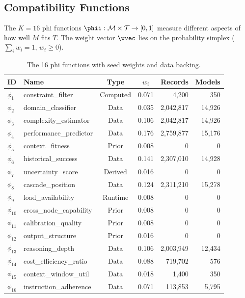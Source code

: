 \subsection{Compatibility Functions}

The $K=16$ phi functions $\phii: \mathcal{M} \times \mathcal{T} \to [0,1]$ measure different aspects of how well $M$ fits $T$. The weight vector $\wvec$ lies on the probability simplex ($\sum_i w_i = 1$, $w_i \geq 0$).

\begin{table}[h]
\centering
\caption{The 16 phi functions with seed weights and data backing.}
\label{tab:phi_functions}
\small
\begin{tabular}{llccrr}
\toprule
\textbf{ID} & \textbf{Name} & \textbf{Type} & \textbf{$w_i$} & \textbf{Records} & \textbf{Models} \\
\midrule
$\phi_1$ & constraint\_filter & Computed & 0.071 & 4{,}200 & 350 \\
$\phi_2$ & domain\_classifier & Data & 0.035 & 2{,}042{,}817 & 14{,}926 \\
$\phi_3$ & complexity\_estimator & Data & 0.106 & 2{,}042{,}817 & 14{,}926 \\
$\phi_4$ & performance\_predictor & Data & 0.176 & 2{,}759{,}877 & 15{,}176 \\
$\phi_5$ & context\_fitness & Prior & 0.008 & 0 & 0 \\
$\phi_6$ & historical\_success & Data & 0.141 & 2{,}307{,}010 & 14{,}928 \\
$\phi_7$ & uncertainty\_score & Derived & 0.016 & 0 & 0 \\
$\phi_8$ & cascade\_position & Data & 0.124 & 2{,}311{,}210 & 15{,}278 \\
$\phi_9$ & load\_availability & Runtime & 0.008 & 0 & 0 \\
$\phi_{10}$ & cross\_node\_capability & Prior & 0.008 & 0 & 0 \\
$\phi_{11}$ & calibration\_quality & Prior & 0.008 & 0 & 0 \\
$\phi_{12}$ & output\_structure & Prior & 0.016 & 0 & 0 \\
$\phi_{13}$ & reasoning\_depth & Data & 0.106 & 2{,}003{,}949 & 12{,}434 \\
$\phi_{14}$ & cost\_efficiency\_ratio & Data & 0.088 & 719{,}702 & 576 \\
$\phi_{15}$ & context\_window\_util & Data & 0.018 & 1{,}400 & 350 \\
$\phi_{16}$ & instruction\_adherence & Data & 0.071 & 113{,}853 & 5{,}795 \\
\bottomrule
\end{tabular}
\end{table}

